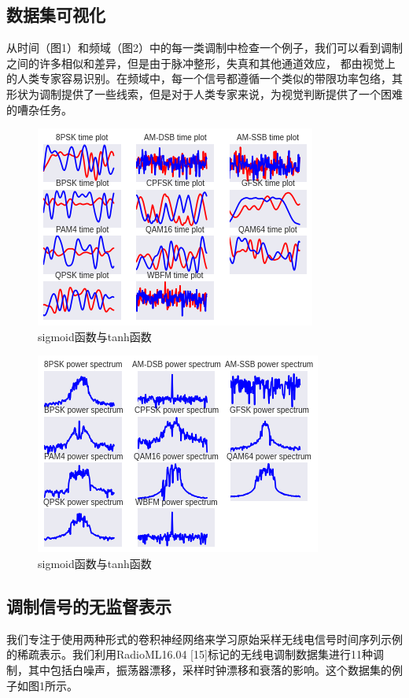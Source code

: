 \subsection{数据集可视化}
从时间（图1）和频域（图2）中的每一类调制中检查一个例子，我们可以看到调制之间的许多相似和差异，但是由于脉冲整形，失真和其他通道效应， 都由视觉上的人类专家容易识别。在频域中，每一个信号都遵循一个类似的带限功率包络，其形状为调制提供了一些线索，但是对于人类专家来说，为视觉判断提供了一个困难的嘈杂任务。\par
\begin{figure}[!h]
	\centering
	\includegraphics[scale=0.9]{figures/chapter_3/signal_view_1}
	\caption{sigmoid函数与tanh函数}\label{fig_2_2}
\end{figure}
\begin{figure}[!h]
	\centering
	\includegraphics[scale=0.9]{figures/chapter_3/signal_view_2}
	\caption{sigmoid函数与tanh函数}\label{fig_2_2}
\end{figure}

\subsection{调制信号的无监督表示}
我们专注于使用两种形式的卷积神经网络来学习原始采样无线电信号时间序列示例的稀疏表示。我们利用RadioML16.04 [15]标记的无线电调制数据集进行11种调制，其中包括白噪声，振荡器漂移，采样时钟漂移和衰落的影响。这个数据集的例子如图1所示。\par

